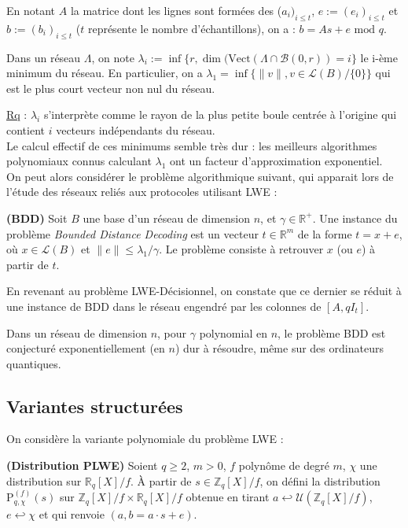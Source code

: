 \documentclass[11pt,a4paper]{article}
\begin{document}
En notant $A$ la matrice dont les lignes sont formées des ($a_i)_{i\leq t}$, $e:=(e_i)_{i\leq t}$ et $b:=(b_i)_{i\leq t}$ ($t$ représente le nombre d'échantillons), on a : $b=As +e \text{ mod } q$.

\begin{defin}
Dans un réseau $\Lambda$, on note $\lambda_i := \inf\{r,\dim(\text{Vect}(\Lambda\cap\mathcal{B}(0,r))=i\}$ le i-ème minimum du réseau. En particulier, on a $\lambda_1 = \inf\{\|v\| ,  v \in \mathcal{L}(B)/\{0\}\}$ qui est le plus court vecteur non nul du réseau.
\end{defin}

\underline{Rq} : $\lambda_i$ s'interprète comme le rayon de la plus petite boule centrée à l'origine qui contient $i$ vecteurs indépendants du réseau. \\ Le calcul effectif de ces minimums semble très dur : les meilleurs algorithmes polynomiaux connus calculant $\lambda_1$ ont un facteur d'approximation exponentiel. \\

On peut alors considérer le problème algorithmique suivant, qui apparait lors de l'étude des réseaux reliés aux protocoles utilisant LWE : 

\begin{defin}\textbf{(BDD)}
Soit $B$ une base d'un réseau de dimension $n$, et $\gamma \in \mathbb{R}^+$. Une instance du problème \textit{Bounded Distance Decoding} est un vecteur $t \in \mathbb{R}^m$ de la forme $t=x+e$, où $x\in \mathcal{L}(B)$ et $\|e\| \leq \lambda_1/\gamma$. Le problème consiste à retrouver $x$ (ou $e$) à partir de $t$.
\end{defin}

En revenant au problème LWE-Décisionnel, on constate que ce dernier se réduit à une instance de BDD dans le réseau engendré par les colonnes de $[A,qI_t]$.

\begin{conj}
Dans un réseau de dimension $n$, pour $\gamma$ polynomial en $n$, le problème BDD est conjecturé exponentiellement (en $n$) dur à résoudre, même sur des ordinateurs quantiques.
\end{conj}

\subsection{Variantes structurées}

On considère la variante polynomiale du problème LWE :
\begin{defin}\textbf{(Distribution PLWE)}
Soient $q \geq 2$, $m>0$, $f$ polynôme de degré $m$, $\chi$ une distribution sur $\mathbb{R}_q[X]/f$. À partir de $s\in \mathbb{Z}_q[X]/f$, on défini la distribution $\text{P}^{(f)}_{q,\chi}(s)$ sur $\mathbb{Z}_q[X]/f \times \mathbb{R}_q[X]/f$ obtenue en tirant $a \hookleftarrow \mathcal{U}(\mathbb{Z}_q[X]/f)$, $e\hookleftarrow \chi$ et qui renvoie $(a,b=a\cdot s+e)$.
\end{defin}
\end{document}
